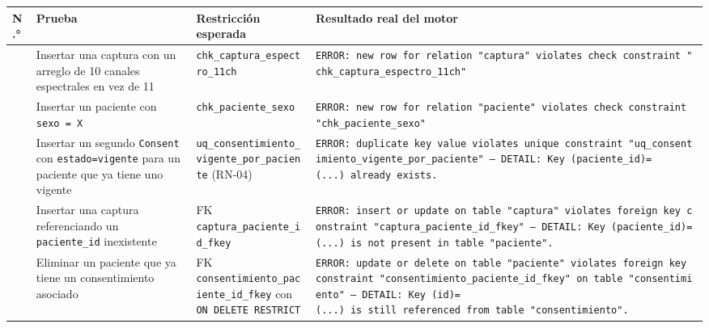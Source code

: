 \documentclass[11pt,a4paper]{article}
\begin{document}
{\small
\begin{longtable}[]{@{}
  >{\raggedright\arraybackslash}p{}
  >{\raggedright\arraybackslash}p{}
  >{\raggedright\arraybackslash}p{}
  >{\raggedright\arraybackslash}p{}@{}}
\toprule\noalign{}
\begin{minipage}[b]{\linewidth}\raggedright
N.°
\end{minipage} & \begin{minipage}[b]{\linewidth}\raggedright
Prueba
\end{minipage} & \begin{minipage}[b]{\linewidth}\raggedright
Restricción esperada
\end{minipage} & \begin{minipage}[b]{\linewidth}\raggedright
Resultado real del motor
\end{minipage} \\
\midrule\noalign{}
\endhead
\bottomrule\noalign{}
\endlastfoot
1 & Insertar una captura con un arreglo de 10 canales espectrales en vez de 11 & \texttt{chk\_captura\_espectro\_11ch} & \texttt{ERROR:\ new\ row\ for\ relation\ "captura"\ violates\ check\ constraint\ "chk\_captura\_espectro\_11ch"} \\
2 & Insertar un paciente con \texttt{sexo\ =\ \textquotesingle{}X\textquotesingle{}} & \texttt{chk\_paciente\_sexo} & \texttt{ERROR:\ new\ row\ for\ relation\ "paciente"\ violates\ check\ constraint\ "chk\_paciente\_sexo"} \\
3 & Insertar un segundo \texttt{Consent} con \texttt{estado=\textquotesingle{}vigente\textquotesingle{}} para un paciente que ya tiene uno vigente & \texttt{uq\_consentimiento\_vigente\_por\_paciente} (RN-04) & \texttt{ERROR:\ duplicate\ key\ value\ violates\ unique\ constraint\ "uq\_consentimiento\_vigente\_por\_paciente"\ —\ DETAIL:\ Key\ (paciente\_id)=(...)\ already\ exists.} \\
4 & Insertar una captura referenciando un \texttt{paciente\_id} inexistente & FK \texttt{captura\_paciente\_id\_fkey} & \texttt{ERROR:\ insert\ or\ update\ on\ table\ "captura"\ violates\ foreign\ key\ constraint\ "captura\_paciente\_id\_fkey"\ —\ DETAIL:\ Key\ (paciente\_id)=(...)\ is\ not\ present\ in\ table\ "paciente".} \\
5 & Eliminar un paciente que ya tiene un consentimiento asociado & FK \texttt{consentimiento\_paciente\_id\_fkey} con \texttt{ON\ DELETE\ RESTRICT} & \texttt{ERROR:\ update\ or\ delete\ on\ table\ "paciente"\ violates\ foreign\ key\ constraint\ "consentimiento\_paciente\_id\_fkey"\ on\ table\ "consentimiento"\ —\ DETAIL:\ Key\ (id)=(...)\ is\ still\ referenced\ from\ table\ "consentimiento".} \\

\end{longtable}}
\end{document}
